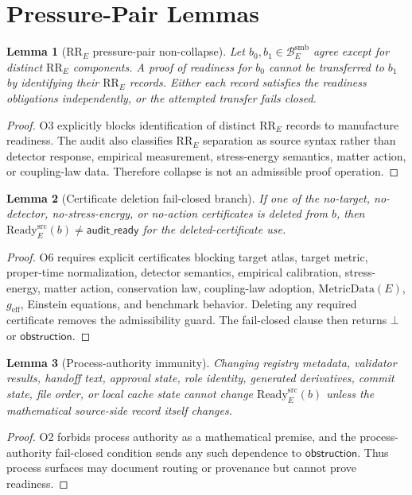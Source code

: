 \documentclass[11pt]{article}
\newcommand{\BridgeDom}{\mathcal B^{\mathrm{smb}}_E}
\newcommand{\Ready}{\mathrm{Ready}^{\mathrm{src}}_E}
\newcommand{\AuditReady}{\mathsf{audit\_ready}}
\newcommand{\Obstruction}{\mathsf{obstruction}}
\newcommand{\Bottom}{\bot}
\newcommand{\MetricData}{\mathrm{MetricData}}
\newcommand{\geff}{g_{\mathrm{eff}}}
\newtheorem{lemma}{Lemma}
\begin{document}
\section{Pressure-Pair Lemmas}

\begin{lemma}[\(\mathrm{RR}_E\) pressure-pair non-collapse]
Let \(b_0,b_1\in\BridgeDom\) agree except for distinct
\(\mathrm{RR}_E\) components. A proof of readiness for \(b_0\) cannot be
transferred to \(b_1\) by identifying their \(\mathrm{RR}_E\) records. Either
each record satisfies the readiness obligations independently, or the
attempted transfer fails closed.
\end{lemma}

\begin{proof}
O3 explicitly blocks identification of distinct \(\mathrm{RR}_E\) records to
manufacture readiness. The audit also classifies \(\mathrm{RR}_E\) separation
as source syntax rather than detector response, empirical measurement,
stress-energy semantics, matter action, or coupling-law data. Therefore
collapse is not an admissible proof operation.
\end{proof}

\begin{lemma}[Certificate deletion fail-closed branch]
If one of the no-target, no-detector, no-stress-energy, or no-action
certificates is deleted from \(b\), then \(\Ready(b)\neq\AuditReady\) for the
deleted-certificate use.
\end{lemma}

\begin{proof}
O6 requires explicit certificates blocking target atlas, target metric,
proper-time normalization, detector semantics, empirical calibration,
stress-energy, matter action, conservation law, coupling-law adoption,
\(\MetricData(E)\), \(\geff\), Einstein equations, and benchmark behavior.
Deleting any required certificate removes the admissibility guard. The
fail-closed clause then returns \(\Bottom\) or \(\Obstruction\).
\end{proof}

\begin{lemma}[Process-authority immunity]
Changing registry metadata, validator results, handoff text, approval state,
role identity, generated derivatives, commit state, file order, or local cache
state cannot change \(\Ready(b)\) unless the mathematical source-side record
itself changes.
\end{lemma}

\begin{proof}
O2 forbids process authority as a mathematical premise, and the
process-authority fail-closed condition sends any such dependence to
\(\Obstruction\). Thus process surfaces may document routing or provenance but
cannot prove readiness.
\end{proof}
\end{document}
